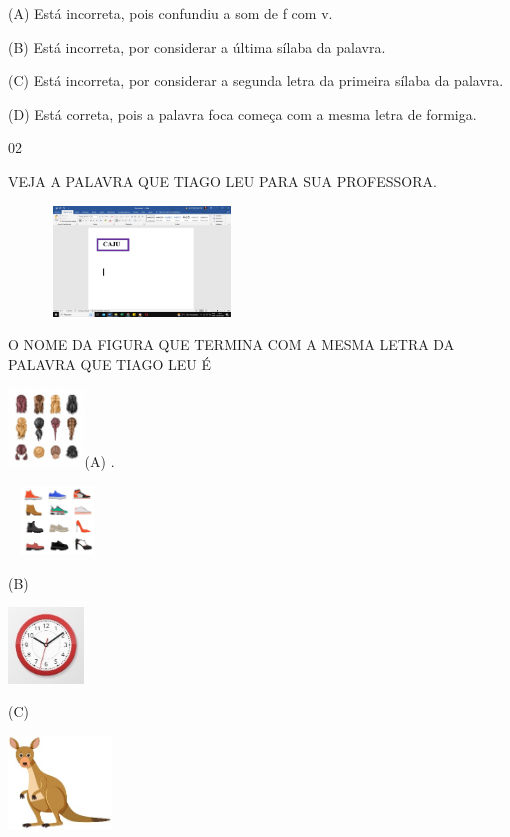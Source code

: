 {\protect\hypertarget{_Hlk129110473}{}{}(A) Está incorreta, pois
confundiu a som de f com v.

(B) Está incorreta, por considerar a última sílaba da palavra.

(C) Está incorreta, por considerar a segunda letra da primeira sílaba da
palavra.

(D) Está correta, pois a palavra foca começa com a mesma letra de
formiga.

\num{02}

VEJA A PALAVRA QUE TIAGO LEU PARA SUA PROFESSORA.

\includegraphics[width=2.79792in,height=1.15833in]{media/image43.png}

O NOME DA FIGURA QUE TERMINA COM A MESMA LETRA DA PALAVRA QUE TIAGO LEU
É

\includegraphics[width=0.79792in,height=0.81667in]{media/image44.jpeg}(A)
.

\includegraphics[width=1.02847in,height=0.72292in]{media/image45.jpeg}

(B)

\includegraphics[width=0.79792in,height=0.79931in]{media/image46.jpeg}

(C)

\includegraphics[width=1.08611in,height=0.97222in]{media/image47.jpeg}

}
